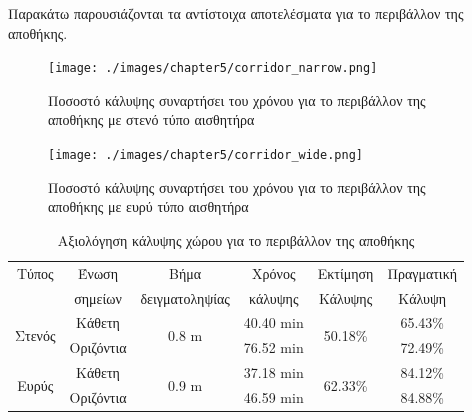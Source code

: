 Παρακάτω παρουσιάζονται τα αντίστοιχα αποτελέσματα για το περιβάλλον της αποθήκης.

\begin{figure}[!ht]
    \texttt{[image: ./images/chapter5/corridor\_narrow.png]}
    \caption{Ποσοστό κάλυψης συναρτήσει του χρόνου για το περιβάλλον της αποθήκης με στενό τύπο αισθητήρα}
     \label{fig:warehouse_narrow}
\end{figure} 

\begin{figure}[!ht]
    \texttt{[image: ./images/chapter5/corridor\_wide.png]}
    \caption{Ποσοστό κάλυψης συναρτήσει του χρόνου για το περιβάλλον της αποθήκης με ευρύ τύπο αισθητήρα}
     \label{fig:warehouse_wide}
\end{figure} 

\begin{table}[H]
    \begin{center}
        \caption{Αξιολόγηση κάλυψης χώρου για το περιβάλλον της αποθήκης}
        \label{tab:coverage_warehouse}
        \begin{tabular}{ | c | c | c | c | c | c |}
        \hline
        \rowcolor{Gray}
        Τύπος                   & Ένωση     & Βήμα                        & Χρόνος         & Εκτίμηση                 & Πραγματική \\
        \rowcolor{Gray}
                                & σημείων   & δειγματοληψίας              & κάλυψης        & Κάλυψης                  & Κάλυψη     \\
        \hline
        \multirow{2}{*}{Στενός} & Κάθετη    & \multirow{2}{*}{0.8 \si{m}} & 40.40 \si{min} & \multirow{2}{*}{50.18\%} & 65.43\%    \\
        \cline{2-2}\cline{4-4}\cline{6-6}
                                & Οριζόντια &                             & 76.52 \si{min} &                          & 72.49\%    \\
        \hline
        \multirow{2}{*}{Ευρύς} & Κάθετη     & \multirow{2}{*}{0.9 \si{m}} & 37.18 \si{min} & \multirow{2}{*}{62.33\%} & 84.12\%    \\
        \cline{2-2}\cline{4-4}\cline{6-6}
                               & Οριζόντια  &                             & 46.59 \si{min} &                          & 84.88\%    \\
        \hline
        \end{tabular}
    \end{center}
\end{table}

